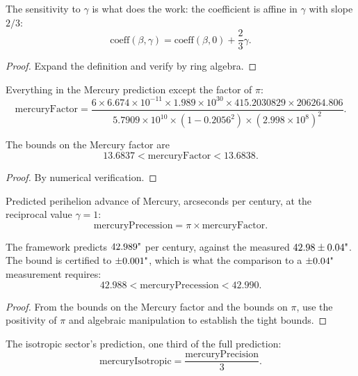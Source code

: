 \begin{theorem}
The sensitivity to $\gamma$ is what does the work: the coefficient is affine in $\gamma$ with slope $2/3$:
\[
\text{coeff}(\beta, \gamma) = \text{coeff}(\beta, 0) + \frac{2}{3}\gamma.
\]
\begin{proof}
Expand the definition and verify by ring algebra.
\end{proof}
\end{theorem}

\begin{definition}
Everything in the Mercury prediction except the factor of $\pi$:
\[
\text{mercuryFactor} = \frac{6 \times 6.674 \times 10^{-11} \times 1.989 \times 10^{30} \times 415.2030829 \times 206264.806}{5.7909 \times 10^{10} \times (1 - 0.2056^2) \times (2.998 \times 10^8)^2}.
\]
\end{definition}

\begin{theorem}
The bounds on the Mercury factor are
\[
13.6837 < \text{mercuryFactor} < 13.6838.
\]
\begin{proof}
By numerical verification.
\end{proof}
\end{theorem}

\begin{definition}
Predicted perihelion advance of Mercury, arcseconds per century, at the reciprocal value $\gamma = 1$:
\[
\text{mercuryPrecession} = \pi \times \text{mercuryFactor}.
\]
\end{definition}

\begin{theorem}
The framework predicts $42.989 \text{\textquotedbl}$ per century, against the measured $42.98 \pm 0.04 \text{\textquotedbl}$. The bound is certified to $\pm 0.001 \text{\textquotedbl}$, which is what the comparison to a $\pm 0.04 \text{\textquotedbl}$ measurement requires:
\[
42.988 < \text{mercuryPrecession} < 42.990.
\]
\begin{proof}
From the bounds on the Mercury factor and the bounds on $\pi$, use the positivity of $\pi$ and algebraic manipulation to establish the tight bounds.
\end{proof}
\end{theorem}

\begin{definition}
The isotropic sector's prediction, one third of the full prediction:
\[
\text{mercuryIsotropic} = \frac{\text{mercuryPrecision}}{3}.
\]
\end{definition}

